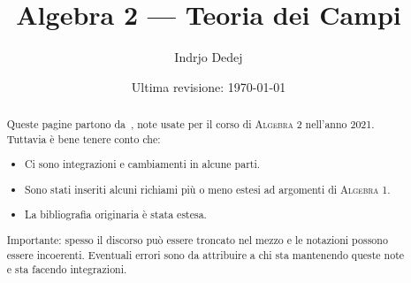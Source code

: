 


\title{Algebra 2 --- Teoria dei Campi}
\author{Indrjo Dedej}
\date{Ultima revisione: \today}



\maketitle

\tableofcontents

\printbibliography[title=Testi di riferimento]

\clearpage

\begin{abstract}
Queste pagine partono da~\cite{canonaco:campi}, note usate per il corso di {\scshape Algebra 2} nell'anno 2021. Tuttavia è bene tenere conto che:
\begin{itemize}[leftmargin=*]
\item Ci sono integrazioni e cambiamenti in alcune parti.
\item Sono stati inseriti alcuni richiami più o meno estesi ad argomenti di {\scshape Algebra 1}.
\item La bibliografia originaria è stata estesa.
\end{itemize}
Importante: spesso il discorso può essere troncato nel mezzo e le notazioni possono essere incoerenti. Eventuali errori sono da attribuire a chi sta mantenendo queste note e sta facendo integrazioni.
\end{abstract}

\clearpage



















